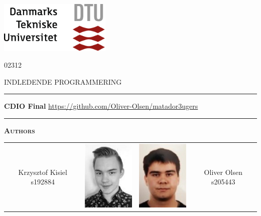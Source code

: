 
\begin{titlepage}
\begin{center}
\includegraphics[width=0.4\textwidth]{root/dtu.png}
\vspace{1cm}

02312

INDLEDENDE PROGRAMMERING

\vspace{.5cm}

\hrule
\vspace{.5cm}
{ \huge \bfseries CDIO Final} %
\vspace{.3cm}\linebreak
\url{https://github.com/Oliver-Olsen/matador3ugers}
\vspace{.3cm}
\hrule
\vspace{.5cm}

\textsc{\textbf{Authors}}\\
\vspace{.5cm}


\begin{tabular}[!c]{cccc}
  Krzysztof Kisiel s192884 & \includegraphics[width=2.75cm]{root/krzysztof.png} &   \includegraphics[width=2.75cm]{root/oliver.png} & Oliver Olsen s205443  \\


\end{tabular}
\end{center}
\end{titlepage}
